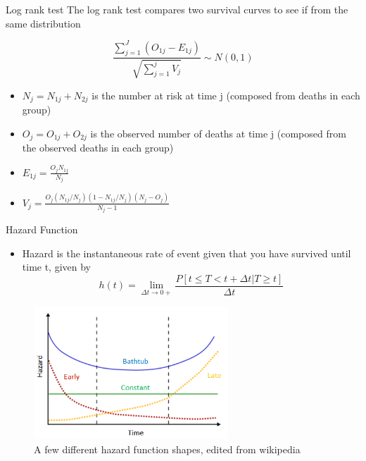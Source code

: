 \begin{frame}{Log rank test}
The log rank test compares two survival curves to see if from the same distribution

$$\frac{\sum_{j=1}^{J}(O_{1j}-E_{1j})}{\sqrt{\sum_{j=1}^{j}V_{j}}}\sim N(0,1)$$
\begin{itemize}
 \item $N_j=N_{1j}+N_{2j}$ is the number at risk at time j (composed from deaths in each group)
 \item $O_j=O_{1j}+O_{2j}$ is the observed number of deaths at time j (composed from the observed deaths in each group)
 \item $E_{1j}=\frac{O_jN_{1j}}{N_j}$
 \item $V_j=\frac{O_j(N_{1j}/N_j)(1-N_{1j}/N_j)(N_{j}-O_{j})}{N_j -1}$
 \end{itemize}
\end{frame}


\begin{frame}{Hazard Function}
\begin{itemize}
 \item Hazard is the instantaneous rate of event given that you have survived until time t, given 
 by $$h(t)=\lim_{\Delta t \rightarrow 0+}\frac{P[t\leq T<t+\Delta t|T\geq t]}{\Delta t}$$
\end{itemize}
 \begin{figure}[h!]
  \centering
    \includegraphics[width=0.65\textwidth]{hazard.png}
  \caption{A few different hazard function shapes, edited from wikipedia}
\label{fig:hazard}
\end{figure}
\end{frame}

